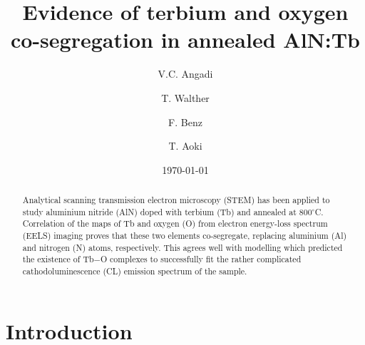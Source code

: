 \documentclass[%
aip,
rsi,%
 amsmath,amssymb,%
 reprint,%
]{revtex4-1}
\begin{document}

\title[Sample title]{Evidence of terbium and oxygen co-segregation in annealed AlN:Tb}%

\author{V.C. Angadi}

\author{T. Walther}%


\author{F. Benz}

\author{T. Aoki}

\date{\today}%

\begin{abstract}
Analytical scanning transmission electron microscopy (STEM) has been applied to study aluminium nitride (AlN) doped with terbium (Tb) and annealed at $800^\circ$C. Correlation of the maps of Tb and oxygen (O) from electron energy-loss spectrum (EELS) imaging proves that these two elements co-segregate, replacing aluminium (Al) and nitrogen (N) atoms, respectively. This agrees well with modelling which predicted the existence of Tb$-$O complexes to successfully fit the rather complicated cathodoluminescence (CL) emission spectrum of the sample.

\end{abstract}

\maketitle

\section{Introduction}
\label{sec:Intro}
\end{document}
